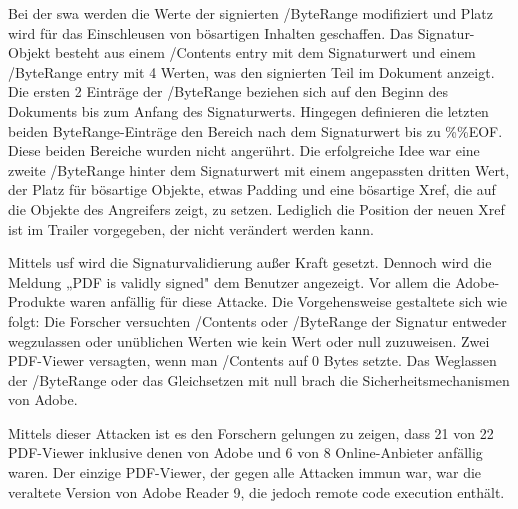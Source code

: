 \par
Bei der \gls{swa} werden die Werte der signierten /ByteRange modifiziert und Platz wird für das Einschleusen von bösartigen Inhalten geschaffen. Das Signatur-Objekt besteht aus einem /Contents entry mit dem Signaturwert und einem /ByteRange entry mit 4 Werten, was den signierten Teil im Dokument anzeigt. Die ersten 2 Einträge der /ByteRange beziehen sich auf den Beginn des Dokuments bis zum Anfang des Signaturwerts. Hingegen definieren die letzten beiden ByteRange-Einträge den Bereich nach dem Signaturwert bis zu \%\%EOF. Diese beiden Bereiche wurden nicht angerührt. Die erfolgreiche Idee war eine zweite /ByteRange hinter dem Signaturwert mit einem angepassten dritten Wert, der Platz für bösartige Objekte, etwas Padding und eine bösartige Xref, die auf die Objekte des Angreifers zeigt, zu setzen. Lediglich die Position der neuen Xref ist im Trailer vorgegeben, der nicht verändert werden kann. \cite{ccc-break-pdf}
\par
Mittels \gls{usf} wird die Signaturvalidierung außer Kraft gesetzt. Dennoch wird die Meldung „PDF is validly signed" dem Benutzer angezeigt. Vor allem die Adobe-Produkte waren anfällig für diese Attacke. Die Vorgehensweise gestaltete sich wie folgt: Die Forscher versuchten /Contents oder /ByteRange der Signatur entweder wegzulassen oder unüblichen Werten wie kein Wert oder null zuzuweisen. Zwei PDF-Viewer versagten, wenn man /Contents auf 0 Bytes setzte. Das Weglassen der /ByteRange oder das Gleichsetzen mit null brach die Sicherheitsmechanismen von Adobe. \cite{ccc-break-pdf}
\par
Mittels dieser Attacken ist es den Forschern gelungen zu zeigen, dass 21 von 22 PDF-Viewer inklusive denen von Adobe und 6 von 8 Online-Anbieter anfällig waren. Der einzige PDF-Viewer, der gegen alle Attacken immun war, war die veraltete Version von Adobe Reader 9, die jedoch remote code execution enthält. \cite{ccc-break-pdf}